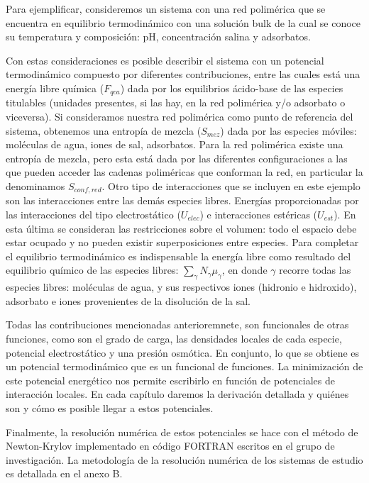 Para ejemplificar, consideremos un sistema con una red polim\'erica que se encuentra en equilibrio termodin\'amico con una soluci\'on bulk de la cual se conoce su temperatura y composici\'on: pH, concentraci\'on salina y adsorbatos.

Con estas consideraciones es posible describir el sistema con un potencial termodin\'amico compuesto por diferentes contribuciones, entre las cuales est\'a una energ\'ia libre qu\'imica ($F_{qca}$) dada por los equilibrios \'acido-base de las especies titulables (unidades presentes, si las hay, en la red polim\'erica y/o adsorbato o viceversa).
Si consideramos nuestra red polim\'erica como punto de referencia del sistema, obtenemos una entrop\'ia de mezcla ($S_{mez}$) dada por las especies m\'oviles: mol\'eculas de agua, iones de sal, adsorbatos.
Para la red polim\'erica existe una entrop\'ia de mezcla, pero esta est\'a dada por las diferentes configuraciones a las que pueden acceder las cadenas polim\'ericas que conforman la red, en particular la denominamos $S_{conf,red}$.
Otro tipo de interacciones que se incluyen en este ejemplo son las interacciones entre las dem\'as especies libres. Energ\'ias proporcionadas por las interacciones del tipo electrost\'atico ($U_{elec}$) e interacciones est\'ericas ($U_{est}$). En esta \'ultima se consideran las restricciones sobre el volumen: todo el espacio debe estar ocupado y no pueden existir superposiciones entre especies.
Para completar el equilibrio termodin\'amico es indispensable la energ\'ia libre como resultado del equilibrio qu\'imico de las especies libres: $\sum_\gamma N_\gamma \mu_\gamma$, en donde $\gamma$ recorre todas las especies libres:
mol\'eculas de agua, y sus respectivos iones (hidronio e hidroxido), adsorbato e iones provenientes de la disoluci\'on de la sal.

Todas las contribuciones mencionadas anterioremnete, son funcionales de otras funciones, como son el grado de carga, las densidades locales de cada especie, potencial electrost\'atico y una presi\'on osm\'otica. En conjunto, lo que se obtiene es un potencial termodin\'amico que es un funcional de funciones.
La minimizaci\'on de este potencial energ\'etico nos permite escribirlo en funci\'on de potenciales de interacci\'on locales. En cada cap\'itulo daremos la derivaci\'on detallada y qui\'enes son y c\'omo es posible llegar a estos potenciales.

Finalmente, la resolución num\'erica de estos potenciales se hace con el m\'etodo de Newton-Krylov \cite{brown1994convergence} implementado en c\'odigo FORTRAN escritos en el grupo de investigaci\'on. La metodolog\'ia de la resoluci\'on num\'erica de los sistemas de estudio es detallada en el anexo B.



